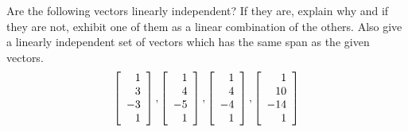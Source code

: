 \begin{enumialphparenastyle}
\begin{ex} Are the following vectors linearly independent? If they are, explain
why and if they are not, exhibit one of them as a linear combination of the
others. Also give a linearly independent set of vectors which has the same
span as the given vectors. 
\begin{equation*}
\left[ 
\begin{array}{r}
1 \\ 
3 \\ 
-3 \\ 
1
\end{array}
\right] ,\left[ 
\begin{array}{r}
1 \\ 
4 \\ 
-5 \\ 
1
\end{array}
\right] ,\left[ 
\begin{array}{r}
1 \\ 
4 \\ 
-4 \\ 
1
\end{array}
\right] ,\left[ 
\begin{array}{r}
1 \\ 
10 \\ 
-14 \\ 
1
\end{array}
\right]
\end{equation*}
\end{ex}


\end{enumialphparenastyle}
